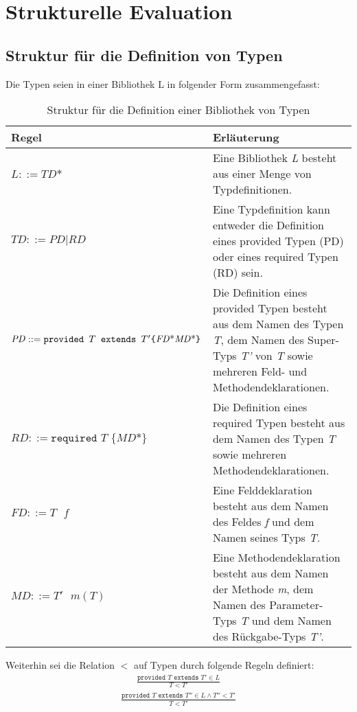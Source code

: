 \section{Strukturelle Evaluation}
\subsection{Struktur für die Definition von Typen}\label{sec:strukturTypen}
Die Typen seien in einer Bibliothek $\text{L}$ in folgender Form zusammengefasst:
\begin{table}[H]
\centering
\begin{tabular}{|p{5.5cm}|p{8.5cm}|}
\hline
\hline
\centering\textbf{Regel} & \textbf{Erläuterung} \\
\hline
\hline
$\mathit{L} ::= \mathit{TD}\text{*}$ & Eine Bibliothek \emph{L} besteht aus einer Menge von Typdefinitionen.\\
\hline
$\mathit{TD} ::= \mathit{PD} | \mathit{RD}$ & Eine Typdefinition kann entweder die Definition eines provided Typen (PD) oder eines required Typen (RD) sein.\\
\hline
$\mathit{PD} ::= \newline\texttt{provided }T \texttt{ extends } T' \newline  \texttt{\{} \mathit{FD}\text{*} \mathit{MD}\text{*}\texttt{\}}$& Die Definition eines provided Typen besteht aus dem Namen des Typen \emph{T}, dem Namen des Super-Typs \emph{T'} von \emph{T} sowie mehreren Feld- und Methodendeklarationen.\\
\hline
$\mathit{RD} ::= \texttt{required } T \texttt{ \{}\mathit{MD}\text{*}\texttt{\}}$ & Die Definition eines required Typen besteht aus dem Namen des Typen \emph{T} sowie mehreren Methodendeklarationen.\\
\hline
$\mathit{FD} ::= T \texttt{ }\mathit{f}$ & Eine Felddeklaration besteht aus dem Namen des Feldes \emph{f} und dem Namen seines Typs \emph{T}.\\
\hline
$\mathit{MD} ::= \mathit{T'}\texttt{ }\mathit{m(T)}$ & Eine Methodendeklaration besteht aus dem Namen der Methode \emph{m}, dem Namen des Parameter-Typs \emph{T} und dem Namen des Rückgabe-Typs \emph{T'}.\\
\hline
\hline
\end{tabular}
\caption{Struktur für die Definition einer Bibliothek von Typen}
 \label{tab:eIShort}
\end{table}
\noindent
Weiterhin sei die Relation $<$ auf Typen durch folgende Regeln definiert:
\begin{gather*}
\frac{\texttt{provided }T \texttt{ extends } T' \in L}{T < T'}
\end{gather*}
\begin{gather*}
\frac{\texttt{provided } T \texttt{ extends } T'' \in L \wedge T'' < T'}{T < T'}
\end{gather*}

